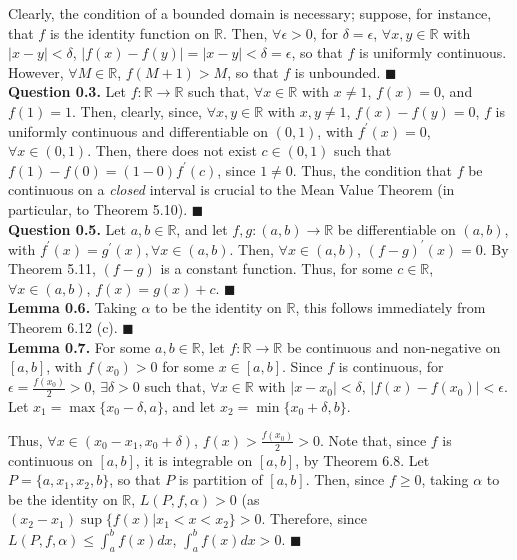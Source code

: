 \documentclass{article}
\begin{document}
Clearly, the condition of a bounded domain is necessary; suppose, for
instance, that $f$ is the identity function on $\mathbb{R}$. Then, $\forall
\epsilon > 0$, for $\delta = \epsilon$, $\forall x, y \in \mathbb{R}$ with
$|x - y| < \delta$, $|f(x) - f(y)| = |x - y| < \delta = \epsilon$, so that $f$
is uniformly continuous. However, $\forall M \in \mathbb{R}$, $f(M + 1) > M$,
so that $f$ is unbounded. \qquad $\blacksquare$ \\

\textbf{Question 0.3.} Let $f: \mathbb{R} \rightarrow \mathbb{R}$ such that,
$\forall x \in \mathbb{R}$ with $x \neq 1$, $f(x) = 0$, and $f(1) = 1$. Then,
clearly, since, $\forall x, y \in \mathbb{R}$ with $x, y \neq 1$,
$f(x) - f(y) = 0$, $f$ is uniformly continuous and differentiable on $(0,1)$,
with $f^{\prime}(x) = 0$, $\forall x \in (0,1)$. Then, there does not exist
$c \in (0,1)$ such that $f(1) - f(0) = (1 - 0) f^{\prime}(c)$, since
$1 \neq 0$. Thus, the condition that $f$ be continuous on a \emph{closed}
interval is crucial to the Mean Value Theorem (in particular, to Theorem
5.10). \qquad $\blacksquare$ \\

\textbf{Question 0.5.} Let $a, b \in \mathbb{R}$, and let $f, g: (a,b)
\rightarrow \mathbb{R}$ be differentiable on $(a,b)$, with
$f^{\prime}(x) = g^{\prime}(x), \forall x \in (a,b)$. Then, $\forall x \in
(a,b)$, $\left(f - g\right)^{\prime} (x) = 0$. By Theorem 5.11, $(f - g)$
is a constant function. Thus, for some $c \in \mathbb{R}$, $\forall x \in
(a,b)$, $f(x) = g(x) + c$. \qquad $\blacksquare$ \\

\textbf{Lemma 0.6.} Taking $\alpha$ to be the identity on $\mathbb{R}$, this
follows immediately from Theorem 6.12 (c). \qquad $\blacksquare$ \\

\textbf{Lemma 0.7.} For some $a, b \in \mathbb{R}$, let $f: \mathbb{R}
\rightarrow \mathbb{R}$ be continuous and non-negative on $[a,b]$, with
$f(x_0) > 0$ for some $x \in [a,b]$. Since $f$ is continuous, for
$\epsilon = \frac{f(x_0)}{2} > 0$, $\exists \delta > 0$ such that,
$\forall x \in \mathbb{R}$ with $|x - x_0| < \delta$,
$|f(x) - f(x_0)| < \epsilon$. Let $x_1 = \max
\{x_0 - \delta, a\}$, and let $x_2 = \min \{x_0 + \delta, b\}$.

Thus, $\forall x \in
(x_0 - x_1, x_0 + \delta)$, $f(x) > \frac{f(x_0)}{2} > 0$. Note that, since
$f$ is continuous on $[a,b]$, it is integrable on $[a,b]$, by Theorem 6.8.
Let $P = \{a,x_1,x_2,b\}$, so that $P$ is partition of $[a,b]$. Then, since
$f \geq 0$, taking $\alpha$ to be the identity on $\mathbb{R}$,
$L(P,f,\alpha) > 0$ (as $(x_2 - x_1) \sup \{f(x) | x_1 < x < x_2\} > 0$.
Therefore, since $L(P,f,\alpha) \leq \int_a^b f(x) dx$, $\int_a^b f(x) dx
 > 0$. \qquad $\blacksquare$ \\
\end{document}
